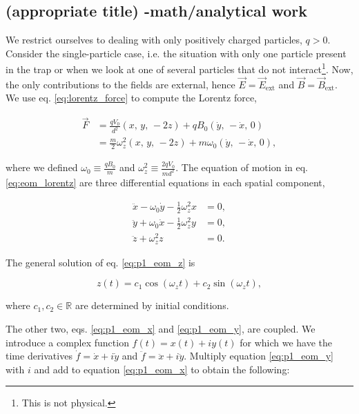 \subsection{(appropriate title) -math/analytical work}

We restrict ourselves to dealing with only positively charged particles, $q>0$. Consider the single-particle case, i.e. the situation with only one particle present in the trap or when we look at one of several particles that do not interact\footnote{This is not physical.}. Now, the only contributions to the fields are external, hence $\vec{E} = \vec{E}_\mathrm{ext}$ and $\vec{B} = \vec{B}_\mathrm{ext}$. We use eq. \eqref{eq:lorentz_force} to compute the Lorentz force,

\begin{equation} \label{eq:p1_lorentz_force_penning}
    \begin{split}
        \vec{F} &= \frac{q V_0}{d^2}(x,\,y,\,-2z) + q B_0 (\dot{y},\,-\dot{x},\,0) \\
        &= \frac{m}{2}\omega_z^2 (x,\,y,\,-2z) + m \omega_0 (\dot{y},\,-\dot{x},\,0),
    \end{split}
\end{equation} 

where we defined $\omega_0 \equiv \frac{qB_0}{m}$ and $\omega_z^2 \equiv \frac{2qV_0}{m d^2}$. The equation of motion in eq. \eqref{eq:eom_lorentz} are three differential equations in each spatial component,

\begin{align}
    \ddot{x} - \omega_0 \dot{y} - \frac{1}{2} \omega_z^2 x &= 0, \label{eq:p1_eom_x} \\ 
    \ddot{y} + \omega_0 \dot{x} - \frac{1}{2} \omega_z^2 y &= 0, \label{eq:p1_eom_y} \\ 
    \ddot{z} + \omega_z^2 z &= 0. \label{eq:p1_eom_z}
\end{align}

The general solution of eq. \eqref{eq:p1_eom_z} is

\begin{equation}
    z(t) = c_1 \cos(\omega_z t) + c_2 \sin(\omega_z t), \label{eq:p1_diffeq_solution_z}
\end{equation}

where $c_1, c_2 \in \mathbb{R}$ are determined by initial conditions.

The other two, eqs. \eqref{eq:p1_eom_x} and \eqref{eq:p1_eom_y}, are coupled. We introduce a complex function $f(t)=x(t) + iy(t)$ for which we have the time derivatives $\dot{f} = \dot{x} + i\dot{y}$ and $\ddot{f} = \ddot{x} + i\ddot{y}$. Multiply equation \eqref{eq:p1_eom_y} with $i$ and add to equation \eqref{eq:p1_eom_x} to obtain the following:

